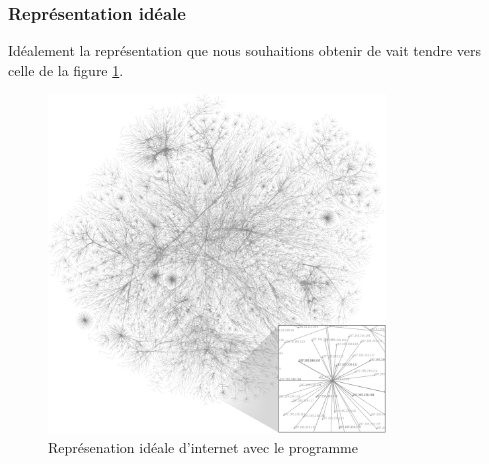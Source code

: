 \subsubsection{Représentation idéale}
Idéalement la représentation que nous souhaitions obtenir de vait tendre vers celle de la figure \ref{ideal}. 
\begin{figure}[H]
\begin{center}
        \includegraphics[width=0.8\textwidth]{./schema/Internet_map_1024_transparent.png}
\caption{Représenation idéale d'internet avec le programme}
\label{ideal}
\end{center}
\end{figure}

